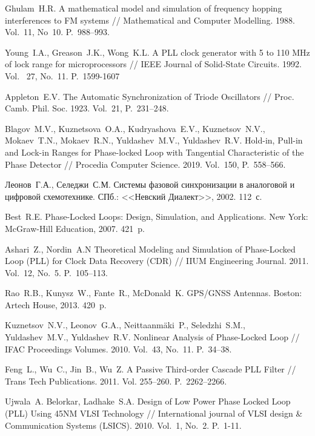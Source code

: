 \documentclass[a4paper,article,14pt]{extarticle}
\begin{document}
\pagebreak
\begin{thebibliography}{20}
 Ghulam~H.\:R. A mathematical model and simulation of frequency hopping interferences to FM systems // Mathematical and Computer Modelling. 1988. Vol.~11, No~10. P.~988--993.

Young~I.\:A., Greason~J.\:K., Wong~K.\:L. A PLL clock generator with 5 to 110 MHz of lock range for microprocessors //  IEEE Journal of Solid-State Circuits. 1992. Vol.~ 27, No.~11. P.~1599-1607

Appleton~E.\:V. The Automatic Synchronization of Triode Oscillators // Proc. Camb. Phil. Soc. 1923. Vol.~21, P.~231--248.

Blagov~M.\:V., Kuznetsova~O.\:A., Kudryashova~E.\:V., Kuznetsov~N.\:V., Mokaev~T.\:N., Mokaev~R.\:N., Yuldashev~M.\:V., Yuldashev~R.\:V. Hold-in, Pull-in and Lock-in Ranges for Phase-locked Loop with Tangential Characteristic of the Phase Detector // Procedia Computer Science. 2019. Vol.~150, P.~558--566.

Леонов~Г.\:А., Селеджи~С.\:М. Системы фазовой синхронизации в аналоговой и цифровой схемотехнике. СПб.: <<Невский Диалект>>, 2002. 112~с.

Best~R.\:E. Phase-Locked Loops: Design, Simulation, and Applications. New York: McGraw-Hill Education, 2007. 421~p.

Ashari~Z., Nordin~A.\:N Theoretical Modeling and Simulation of Phase-Locked Loop (PLL) for Clock Data Recovery (CDR) // IIUM Engineering Journal. 2011. Vol.~12, No.~5. P.~105--113.

Rao~R.\:B., Kunysz~W., Fante~R., McDonald~K. GPS/GNSS Antennas. Boston: Artech House, 2013. 420~p.

Kuznetsov~N.\:V., Leonov~G.\:A., Neittaanmäki~P., Seledzhi~S.\:M., Yuldashev~M.\:V., Yuldashev~R.\:V. Nonlinear Analysis of Phase-Locked Loop // IFAC Proceedings Volumes. 2010. Vol.~43, No.~11. P.~34--38.

Feng~L., Wu~C., Jin~B., Wu~Z. A Passive Third-order Cascade PLL Filter // Trans Tech Publications. 2011. Vol. 255--260. P.~2262--2266.

Ujwala~A. Belorkar, Ladhake~S.\:A. Design of Low Power Phase Locked Loop (PLL) Using 45NM VLSI Technology // International journal of VLSI design \& Communication Systems  (LSICS). 2010. Vol.~1, No.~2. P.~1-11.


\end{thebibliography}
\end{document}
